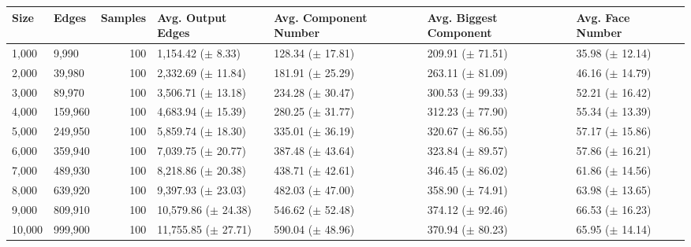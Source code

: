 \begin{tabular}{llrllll}
\toprule
  Size &   Edges &  Samples &       Avg. Output Edges & Avg. Component Number & Avg. Biggest Component &    Avg. Face Number \\
\midrule
 1,000 &   9,990 &      100 &   1,154.42 ($\pm$ 8.33) &  128.34 ($\pm$ 17.81) &   209.91 ($\pm$ 71.51) & 35.98 ($\pm$ 12.14) \\
 2,000 &  39,980 &      100 &  2,332.69 ($\pm$ 11.84) &  181.91 ($\pm$ 25.29) &   263.11 ($\pm$ 81.09) & 46.16 ($\pm$ 14.79) \\
 3,000 &  89,970 &      100 &  3,506.71 ($\pm$ 13.18) &  234.28 ($\pm$ 30.47) &   300.53 ($\pm$ 99.33) & 52.21 ($\pm$ 16.42) \\
 4,000 & 159,960 &      100 &  4,683.94 ($\pm$ 15.39) &  280.25 ($\pm$ 31.77) &   312.23 ($\pm$ 77.90) & 55.34 ($\pm$ 13.39) \\
 5,000 & 249,950 &      100 &  5,859.74 ($\pm$ 18.30) &  335.01 ($\pm$ 36.19) &   320.67 ($\pm$ 86.55) & 57.17 ($\pm$ 15.86) \\
 6,000 & 359,940 &      100 &  7,039.75 ($\pm$ 20.77) &  387.48 ($\pm$ 43.64) &   323.84 ($\pm$ 89.57) & 57.86 ($\pm$ 16.21) \\
 7,000 & 489,930 &      100 &  8,218.86 ($\pm$ 20.38) &  438.71 ($\pm$ 42.61) &   346.45 ($\pm$ 86.02) & 61.86 ($\pm$ 14.56) \\
 8,000 & 639,920 &      100 &  9,397.93 ($\pm$ 23.03) &  482.03 ($\pm$ 47.00) &   358.90 ($\pm$ 74.91) & 63.98 ($\pm$ 13.65) \\
 9,000 & 809,910 &      100 & 10,579.86 ($\pm$ 24.38) &  546.62 ($\pm$ 52.48) &   374.12 ($\pm$ 92.46) & 66.53 ($\pm$ 16.23) \\
10,000 & 999,900 &      100 & 11,755.85 ($\pm$ 27.71) &  590.04 ($\pm$ 48.96) &   370.94 ($\pm$ 80.23) & 65.95 ($\pm$ 14.14) \\
\bottomrule
\end{tabular}

